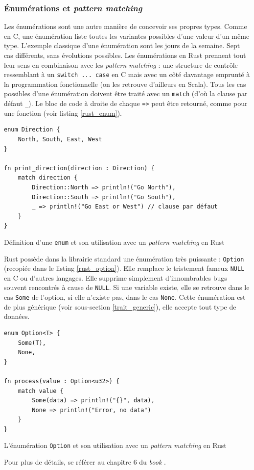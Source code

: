 \documentclass[a4paper, 12pt]{article}
\newenvironment{code}{\captionsetup{type=listing}}{}
\begin{document}
\subsubsection{Énumérations et \textit{pattern matching}}\label{rust_enum_pattern_matching}
Les énumérations sont une autre manière de concevoir ses propres types. Comme en C, une énumération
liste toutes les variantes possibles d'une valeur d'un même type. L'exemple classique d'une énumération 
sont les jours de la semaine. Sept cas différents, sans évolutions possibles. Les énumérations en 
Rust prennent tout leur sens en combinaison avec les \textit{pattern matching} : une structure 
de contrôle ressemblant à un \texttt{switch ... case} en C mais avec un côté davantage 
emprunté à la programmation fonctionnelle (on les retrouve d'ailleurs en Scala). Tous les cas 
possibles d'une énumération doivent être traité avec un \texttt{match} (d'où la clause 
par défaut \texttt{_}). Le bloc de code à droite de chaque \texttt{=>} peut être 
retourné, comme pour une fonction (voir listing \ref{rust_enum}).
\bigbreak
\begin{code}
    \begin{verbatim}
enum Direction {
    North, South, East, West
}

fn print_direction(direction : Direction) {
    match direction {
        Direction::North => println!("Go North"),
        Direction::South => println!("Go South"),
        _ => println!("Go East or West") // clause par défaut
    }
}
    \end{verbatim}
    \caption{Définition d'une \texttt{enum} et son utilisation avec un \textit{pattern matching} en Rust}
    \label{rust_enum}
\end{code}
\bigbreak
Rust possède dans la librairie standard une énumération très puissante : \texttt{Option} 
(recopiée dans le listing \ref{rust_option}). Elle remplace le tristement fameux \texttt{NULL} 
en C ou d'autres langages. Elle supprime simplement d'innombrables bugs souvent rencontrés à cause 
de \texttt{NULL}. Si une variable existe, elle se retrouve dans le cas \texttt{Some} 
de l'option, si elle n'existe pas, dans le cas \texttt{None}. Cette énumération est de 
plus générique (voir sous-section \ref{trait_generic}), elle accepte tout type de données.
\bigbreak
\begin{code}
    \begin{verbatim}
enum Option<T> {
    Some(T),
    None,
}

fn process(value : Option<u32>) {
    match value {
        Some(data) => println!("{}", data),
        None => println!("Error, no data")
    }
}
    \end{verbatim}
    \caption{L'énumération \texttt{Option} et son utilisation avec un \textit{pattern matching} en Rust}
    \label{rust_option}
\end{code}
\bigbreak
Pour plus de détails, se référer au chapitre 6 du \textit{book} \cite{ref0}.
\end{document}
